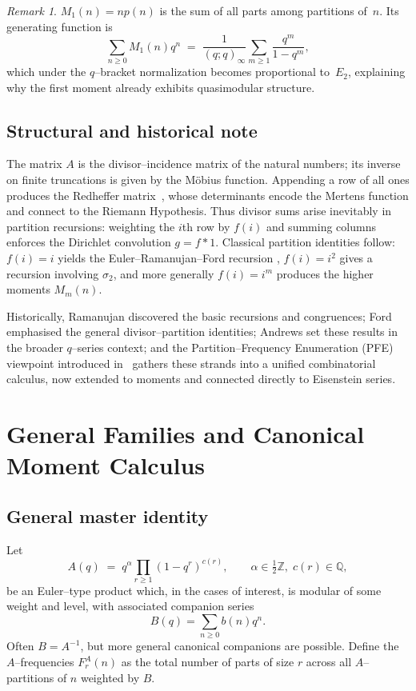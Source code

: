 \documentclass[11pt]{article}
\theoremstyle{definition}
\theoremstyle{remark}
\newtheorem{remark}[theorem]{Remark}
\begin{document}
\begin{remark}
$M_1(n) = np(n)$ is the sum of all parts among partitions of~$n$. Its generating
function is
\[
\sum_{n\ge0} M_1(n)q^n \;=\; \frac{1}{(q;q)_\infty}\sum_{m\ge1}\frac{q^m}{1-q^m},
\]
which under the $q$--bracket normalization becomes proportional to~$E_2$,
explaining why the first moment already exhibits quasimodular structure.
\end{remark}

\subsection{Structural and historical note}

The matrix $A$ is the divisor--incidence matrix of the natural numbers; its
inverse on finite truncations is given by the Möbius function. Appending a
row of all ones produces the Redheffer matrix~\cite{Redheffer77}, whose determinants
encode the Mertens function and connect to the Riemann Hypothesis. Thus
divisor sums arise inevitably in partition recursions: weighting the $i$th row
by $f(i)$ and summing columns enforces the Dirichlet convolution $g=f*1$.
Classical partition identities follow: $f(i)=i$ yields the Euler--Ramanujan--Ford recursion
\cite{Ford16}, $f(i)=i^2$ gives a recursion involving $\sigma_2$, and
more generally $f(i)=i^m$ produces the higher moments $M_m(n)$.

Historically, Ramanujan discovered the basic recursions and congruences;
Ford emphasised the general divisor--partition identities; Andrews set these
results in the broader $q$--series context; and the Partition--Frequency
Enumeration (PFE) viewpoint introduced in~\cite{BB21} gathers these strands
into a unified combinatorial calculus, now extended to moments and connected
directly to Eisenstein series.

\section{General Families and Canonical Moment Calculus}\label{sec:generalisation}

\subsection{General master identity}

Let
\[
A(q)\;=\;q^\alpha \prod_{r\ge1} (1-q^r)^{c(r)},\qquad \alpha\in\tfrac12\mathbb Z,\; c(r)\in\mathbb Q,
\]
be an Euler--type product which, in the cases of interest, is modular of some
weight and level, with associated companion series
\[
B(q)=\sum_{n\ge0} b(n)q^n.
\]
Often $B=A^{-1}$, but more general canonical companions are possible. Define
the $A$--frequencies $F^A_r(n)$ as the total number of parts of size $r$ across
all $A$--partitions of $n$ weighted by $B$.
\end{document}
